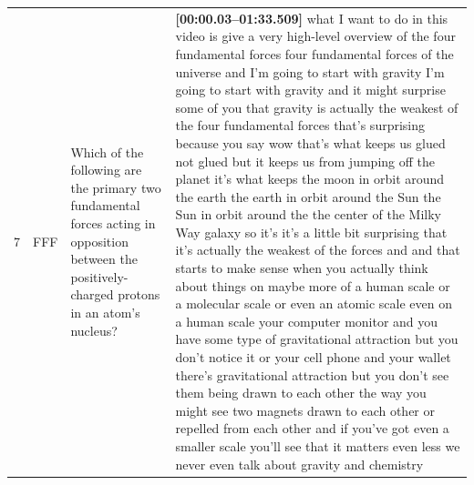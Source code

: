 \documentclass[10pt]{article}
\begin{document}
\begin{tiny}
\begin{longtable}{r p{0.3in} p{1.212in} p{3.8in}}
    7  &          FFF &                                                                                                                                  Which of the following are the primary two fundamental forces acting in opposition between the positively-charged protons in an atom's nucleus? &                                                                                                                                                                                                                                                                                                                                                                                                                                                                                                                                                                                                                                                                                                                                                                                                                                                                                                                                                                                                                                                                                                                                                                                                                                                                                                                                                                                                                                                                                                                                                                                                                                                                                                                                                              \textbf{[00:00.03--01:33.509]} what I want to do in this video is give a very high-level overview of the four fundamental forces four fundamental forces of the universe and I'm going to start with gravity I'm going to start with gravity and it might surprise some of you that gravity is actually the weakest of the four fundamental forces that's surprising because you say wow that's what keeps us glued not glued but it keeps us from jumping off the planet it's what keeps the moon in orbit around the earth the earth in orbit around the Sun the Sun in orbit around the the center of the Milky Way galaxy so it's it's a little bit surprising that it's actually the weakest of the forces and and that starts to make sense when you actually think about things on maybe more of a human scale or a molecular scale or even an atomic scale even on a human scale your computer monitor and you have some type of gravitational attraction but you don't notice it or your cell phone and your wallet there's gravitational attraction but you don't see them being drawn to each other the way you might see two magnets drawn to each other or repelled from each other and if you've got even a smaller scale you'll see that it matters even less we never even talk about gravity and chemistry 
\end{longtable}
\end{tiny}
\end{document}
